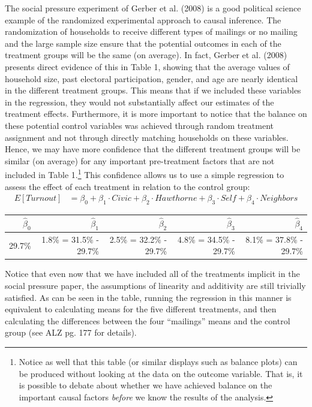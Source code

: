 \documentclass{article}
\begin{document}
The social pressure experiment of Gerber et al. (2008) is a good political science example of the randomized experimental approach to causal inference. The randomization of households to receive different types of mailings or no mailing and the large sample size ensure that the potential outcomes in each of the treatment groups will be the same (on average). In fact, Gerber et al. (2008) presents direct evidence of this in Table 1, showing that the average values of household size, past electoral participation, gender, and age are nearly identical in the different treatment groups. This means that if we included these variables in the regression, they would not substantially affect our estimates of the treatment effects. Furthermore, it is more important to notice that the balance on these potential control variables was achieved through random treatment assignment and not through directly matching households on these variables. Hence, we may have more confidence that the different treatment groups will be similar (on average) for any important pre-treatment factors that are not included in Table 1.\footnote{Notice as well that this table (or similar displays such as balance plots) can be produced without looking at the data on the outcome variable. That is, it is possible to debate about whether we have achieved balance on the important causal factors \emph{before} we know the results of the analysis.} This confidence allows us to use a simple regression to assess the effect of each treatment in relation to the control group:
\begin{align*}
E[Turnout] &= \beta_0 + \beta_1 \cdot Civic + \beta_2 \cdot Hawthorne + \beta_3 \cdot Self  + \beta_4 \cdot Neighbors
\end{align*}
\begin{center}
\begin{tabular}{r|r|r|r|r}
$\widehat{\beta}_0$ & $\widehat{\beta}_1$ & $\widehat{\beta}_2$ & $\widehat{\beta}_3$ & $\widehat{\beta}_4$ \\
\hline
29.7\% & 1.8\% = 31.5\% - 29.7\% & 2.5\% = 32.2\% - 29.7\% & 4.8\% = 34.5\% - 29.7\% & 8.1\% = 37.8\% - 29.7\%  \\
\hline
\end{tabular}
\end{center}
Notice that even now that we have included all of the treatments implicit in the social pressure paper, the assumptions of linearity and additivity are still trivially satisfied. As can be seen in the table, running the regression in this manner is equivalent to calculating means for the five different treatments, and then calculating the differences between the four ``mailings'' means and the control group (see ALZ pg. 177 for details).\\
\end{document}
